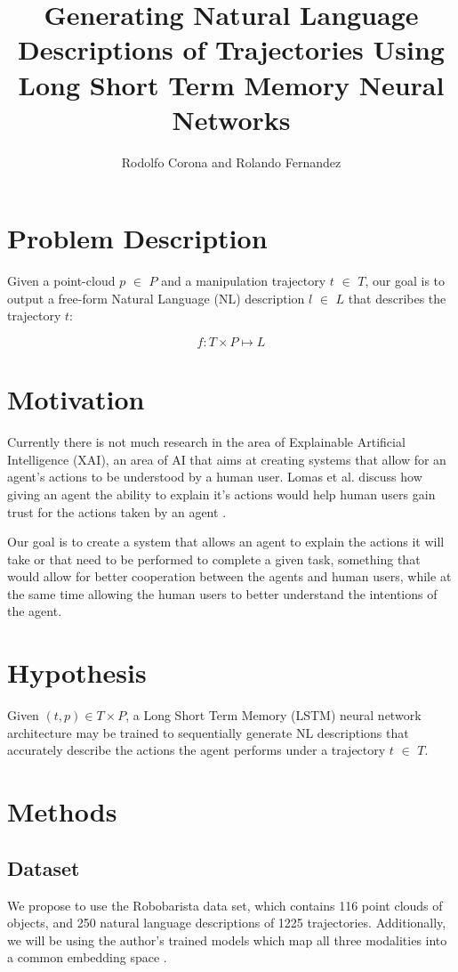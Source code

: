 \documentclass[letterpaper, 12 pt, conference]{ieeeconf}
\title{\LARGE \bf
Generating Natural Language Descriptions of Trajectories Using Long Short Term Memory Neural Networks}
\author{Rodolfo Corona and Rolando Fernandez}
\begin{document}
\maketitle
\thispagestyle{empty}
\pagestyle{empty}


\section{Problem Description}

Given a point-cloud $p$ $\in$ $P$ and a manipulation trajectory $t$ $\in$ $T$, our goal is to output a free-form  Natural Language (NL) description $l$ $\in$ $L$ that describes the trajectory $t$:

\begin{equation}
f: T\times P \mapsto L
\end{equation}

\section{Motivation}

Currently there is not much research in the area of Explainable Artificial Intelligence (XAI), an area of AI that aims at creating systems that allow for an agent's actions to be understood by a human user. Lomas et al. discuss how giving an agent the ability to explain it's actions would help human users gain trust for the actions taken by an agent \cite{lomas2012explaining}.

Our goal is to create a system that allows an agent to explain the actions it will take or that need to be performed to complete a given task, something that would allow for better cooperation between the agents and human users, while at the same time allowing the human users to better understand the intentions of the agent.

\section{Hypothesis}

Given $(t,p)\in T\times P$, a Long Short Term Memory (LSTM) neural network architecture may be trained to sequentially generate NL descriptions that accurately describe the actions the agent performs under a trajectory $t$ $\in$ $T$.

\section{Methods}
\subsection{Dataset}
We propose to use the Robobarista data set, which contains 116 point clouds of objects, and 250 natural language descriptions of 1225 trajectories. Additionally, we will be using the author's trained models which map all three modalities into a common embedding space \cite{sung2016robobarista}.
\end{document}
